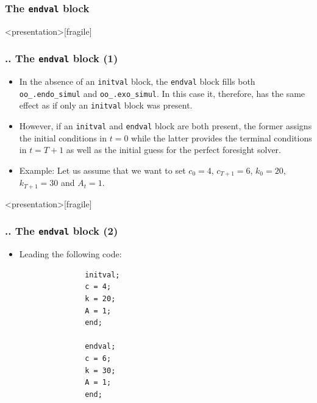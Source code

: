 \documentclass[11pt,aspectratio=169]{beamer}
\begin{document}
\subsubsection{The \texttt{endval} block}
\begin{frame}<presentation>[fragile]
	\frametitle{{\thesection.\thesubsection.\thesubsubsection} The \texttt{endval} block (1)}
	\begin{itemize}
		\justifying
		\item In the absence of an \texttt{initval} block, the \texttt{endval} block fills both \texttt{oo\_.endo\_simul} and \texttt{oo\_.exo\_simul}. In this case it, therefore, has the same effect as if only an \texttt{initval} block was present.
		\item However, if an \texttt{initval} and  \texttt{endval} block are both present, the former assigns the initial conditions in $t=0$ while the latter provides the terminal conditions in $t=T+1$ as well as the initial guess for the perfect foresight solver.
		\item Example: Let us assume that we want to set $c_0=4$, $c_{T+1}=6$, $k_0=20$, $k_{T+1}=30$ and $A_t=1$.
	\end{itemize}
\end{frame}
\begin{frame}<presentation>[fragile]
	\frametitle{{\thesection.\thesubsection.\thesubsubsection} The \texttt{endval} block (2)}
	\begin{itemize}
		\item Leading the following code:
			\begin{verbatim}
			   initval;
			   c = 4;
			   k = 20;
			   A = 1;
			   end;

			   endval;
			   c = 6;
			   k = 30;
			   A = 1;
			   end;
			\end{verbatim}
	\end{itemize}
\end{frame}
\end{document}
